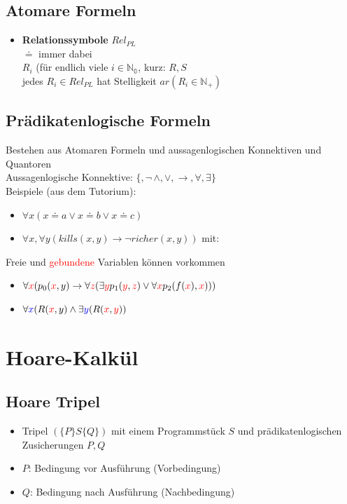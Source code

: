 \documentclass[a4paper,portrait]{scrartcl}
\begin{document}
\subsection{Atomare Formeln}
\begin{itemize}
\item \textbf{Relationssymbole} $Rel_{PL}$ \\
$\doteq$ immer dabei \\
$R_{i}$ (für endlich viele $i \in \mathbb{N_{0}}$, kurz: $R,S$ \\
jedes $R_{i} \in Rel_{PL}$ hat Stelligkeit $ar(R_{i} \in \mathbb{N_{+}})$
\end{itemize}
\subsection{Prädikatenlogische Formeln}
Bestehen aus Atomaren Formeln und aussagenlogischen Konnektiven und Quantoren\\
Aussagenlogische Konnektive: $ \lbrace, \neg\, \wedge, \vee, \rightarrow, \forall, \exists \rbrace $\\
Beispiele (aus dem Tutorium):
\begin{itemize}
\item $ \forall x (x \doteq a \vee x \doteq b \vee x \doteq c) $
\item $ \forall x, \forall y (kills (x,y) \rightarrow \neg richer(x,y)) $ mit:
\end{itemize}
Freie und \textcolor{red}{gebundene} Variablen können vorkommen
\begin{itemize}
\item $ \forall \textcolor{red}{x}(p_{0}(\textcolor{red}{x},y) \rightarrow \forall \textcolor{red}{z} (\exists \textcolor{red}{y}p_{1}(\textcolor{red}{y},\textcolor{red}{z})\vee\forall\textcolor{red}{x}p_{2}(f(\textcolor{red}{x}),\textcolor{red}{x}))) $
\item $ \forall \textcolor{blue}{x}(R(\textcolor{red}{x},y) \wedge \exists \textcolor{blue}{y}(R(\textcolor{red}{x},\textcolor{red}{y})) $
\end{itemize}

\section{Hoare-Kalkül}
\subsection{Hoare Tripel}
\begin{itemize}
\item Tripel $ (\lbrace P \rbrace S \lbrace Q \rbrace )$ mit einem Programmstück $S$ und prädikatenlogischen Zusicherungen $P,Q$
\item $P$: Bedingung vor Ausführung (Vorbedingung)
\item $Q$: Bedingung nach Ausführung (Nachbedingung)
\end{itemize}
\end{document}
